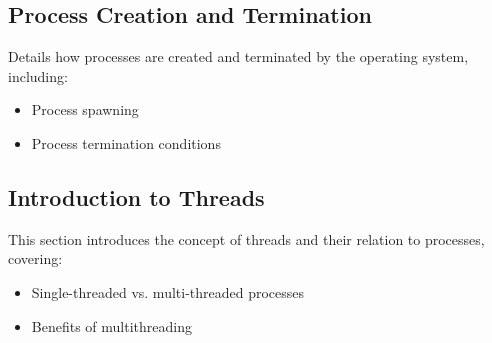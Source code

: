\documentclass[12pt]{article}
\begin{document}
\subsection{Process Creation and Termination}
Details how processes are created and terminated by the operating system, including:
\begin{itemize}
    \item Process spawning
    \item Process termination conditions
\end{itemize}

\subsection{Introduction to Threads}
This section introduces the concept of threads and their relation to processes, covering:
\begin{itemize}
    \item Single-threaded vs. multi-threaded processes
    \item Benefits of multithreading
\end{itemize}
\end{document}
